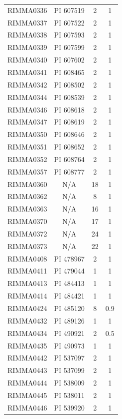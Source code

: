 \documentclass[11pt]{article}
\newcounter{rowno}
\begin{document}
\begin{scriptsize}
\begin{longtable}{>{\stepcounter{rowno}}cccc}
    RIMMA0336 & PI 607519 & 2     & 1 \\
    RIMMA0337 & PI 607522 & 2     & 1 \\
    RIMMA0338 & PI 607593 & 2     & 1 \\
    RIMMA0339 & PI 607599 & 2     & 1 \\
    RIMMA0340 & PI 607602 & 2     & 1 \\
    RIMMA0341 & PI 608465 & 2     & 1 \\
    RIMMA0342 & PI 608502 & 2     & 1 \\
    RIMMA0344 & PI 608539 & 2     & 1 \\
    RIMMA0346 & PI 608618 & 2     & 1 \\
    RIMMA0347 & PI 608619 & 2     & 1 \\
    RIMMA0350 & PI 608646 & 2     & 1 \\
    RIMMA0351 & PI 608652 & 2     & 1 \\
    RIMMA0352 & PI 608764 & 2     & 1 \\
    RIMMA0357 & PI 608777 & 2     & 1 \\
    RIMMA0360 & N/A & 18    & 1 \\
    RIMMA0362 & N/A & 8     & 1 \\
    RIMMA0363 & N/A & 16    & 1 \\
    RIMMA0370 & N/A & 17    & 1 \\
    RIMMA0372 & N/A & 24    & 1 \\
    RIMMA0373 & N/A & 22    & 1 \\
    RIMMA0408 & PI	478967 & 2     & 1 \\
    RIMMA0411 & PI	479044 & 1     & 1 \\
    RIMMA0413 & PI	484413 & 1     & 1 \\
    RIMMA0414 & PI	484421 & 1     & 1 \\
    RIMMA0424 & PI	485120 & 8     & 0.9 \\
    RIMMA0432 & PI	489126 & 1     & 1 \\
    RIMMA0434 & PI	490921 & 2     & 0.5 \\
    RIMMA0435 & PI	490973 & 1     & 1 \\
    RIMMA0442 & PI	537097 & 2     & 1 \\
    RIMMA0443 & PI	537099 & 2     & 1 \\
    RIMMA0444 & PI	538009 & 2     & 1 \\
    RIMMA0445 & PI	538011 & 2     & 1 \\
    RIMMA0446 & PI	539920 & 2     & 1 \\

\end{longtable}
\end{scriptsize}
\end{document}
